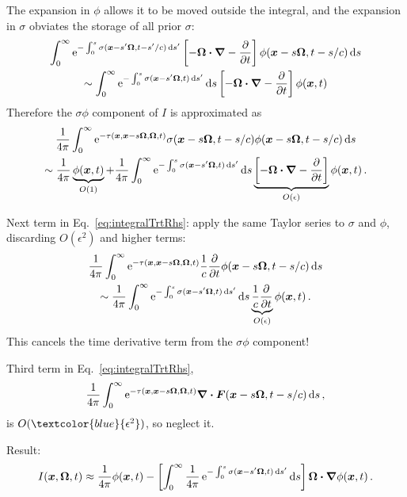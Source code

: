 \documentclass{beamer}
\newcommand{\epsiloncolor}[1]{\textcolor{blue}{#1}}
\begin{document}
\begin{frame}
 The expansion in $\phi$ allows it to be moved outside the integral, and the
 expansion in $\sigma$ obviates the storage of all prior $\sigma$:
\begin{multline*}
  \int_{0}^{\infty} \mathop{}\!\mathrm{e}^{- \int_{0}^{s} \sigma(\bm{x}-s'\bm{\Omega}, t-s'/c) \mathop{}\!\mathrm{d} s'}
\left[ -\bm{\Omega} \bm{\cdot} \bm{\nabla} - \frac{\partial }{\partial t} \right] \phi(\bm{x} - s \bm{\Omega}, t-s/c)
\mathop{}\!\mathrm{d} s
\\
\sim \int_{0}^{\infty} \mathop{}\!\mathrm{e}^{- \int_{0}^{s} \sigma(\bm{x}-s'\bm{\Omega}, t)
\mathop{}\!\mathrm{d} s'} \mathop{}\!\mathrm{d} s
\left[ -\bm{\Omega} \bm{\cdot} \bm{\nabla} - \frac{\partial }{\partial t} \right] \phi(\bm{x}, t)
\end{multline*}
Therefore the $\sigma\phi$ component of $I$ is approximated as
\begin{multline*}
  \frac{1}{4\pi}\int_{0}^{\infty} \mathop{}\!\mathrm{e}^{ -\tau(\bm{x}, \bm{x} - s
  \bm{\Omega}, \bm{\Omega}, t)} \sigma(\bm{x} - s \bm{\Omega}, t-s/c)
  \phi(\bm{x} - s \bm{\Omega}, t-s/c) \mathop{}\!\mathrm{d} s
  \\
  \sim 
  \frac{1}{4\pi}\underbrace{\phi(\bm{x}, t)}_{O(1)}
  + \frac{1}{4\pi}\int_{0}^{\infty} \mathop{}\!\mathrm{e}^{- \int_{0}^{s} \sigma(\bm{x}-s'\bm{\Omega}, t)
\mathop{}\!\mathrm{d} s'} \mathop{}\!\mathrm{d} s
\underbrace{\left[ -\bm{\Omega} \bm{\cdot} \bm{\nabla} - \frac{\partial }{\partial t} \right]}_{O(\epsilon)} \phi(\bm{x}, t)\,.
\end{multline*}
\end{frame}
\begin{frame}
  Next term in Eq.~\eqref{eq:integralTrtRhs}: apply the same Taylor series to
  $\sigma$ and $\phi$, discarding $O(\epsilon^2)$ and higher terms:
\begin{multline*}
  \frac{1}{4\pi}\int_{0}^{\infty} \mathop{}\!\mathrm{e}^{ -\tau(\bm{x}, \bm{x} - s
  \bm{\Omega}, \bm{\Omega}, t)}
  \frac{1}{c} \frac{\partial }{\partial t}\phi(\bm{x} - s \bm{\Omega}, t-s/c) \mathop{}\!\mathrm{d} s
 \\
 \sim 
  \frac{1}{4\pi}\int_{0}^{\infty} \mathop{}\!\mathrm{e}^{- \int_{0}^{s} \sigma(\bm{x}-s'\bm{\Omega}, t)
  \mathop{}\!\mathrm{d} s'} \mathop{}\!\mathrm{d} s
  \underbrace{\frac{1}{c} \frac{\partial }{\partial t}}_{O(\epsilon)}\phi(\bm{x}, t)\,.
\end{multline*}
This cancels the time derivative term from the $\sigma\phi$ component!

Third term in Eq.~\eqref{eq:integralTrtRhs},
  \begin{equation*}
    \frac{1}{4\pi}\int_{0}^{\infty} \mathop{}\!\mathrm{e}^{ -\tau(\bm{x}, \bm{x} - s
    \bm{\Omega}, \bm{\Omega}, t)}
    \bm{\nabla} \bm{\cdot} \bm{F}(\bm{x} - s \bm{\Omega}, t-s/c) \mathop{}\!\mathrm{d} s\,,
  \end{equation*}
is $O(\epsiloncolor{\epsilon^2})$, so neglect it.

Result: 
\begin{equation} \label{eq:anisotropicIntensity}
  I(\bm{x}, \bm{\Omega}, t) \approx
  \frac{1}{4\pi}\phi(\bm{x}, t) - \left[ \int_{0}^{\infty} \frac{1}{4\pi}
  \mathop{}\!\mathrm{e}^{- \int_{0}^{s} \sigma(\bm{x}-s'\bm{\Omega}, t)
  \mathop{}\!\mathrm{d} s'} \mathop{}\!\mathrm{d} s\right]
\bm{\Omega} \bm{\cdot} \bm{\nabla} \phi(\bm{x}, t)\,.
\end{equation}
\end{frame}
\end{document}
